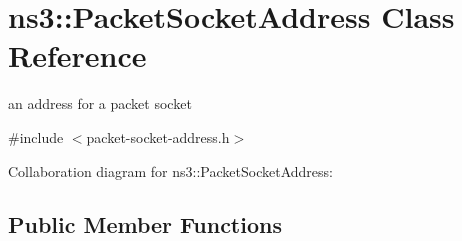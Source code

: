 \hypertarget{classns3_1_1PacketSocketAddress}{}\section{ns3\+:\+:Packet\+Socket\+Address Class Reference}
\label{classns3_1_1PacketSocketAddress}


an address for a packet socket  




{\ttfamily \#include $<$packet-\/socket-\/address.\+h$>$}



Collaboration diagram for ns3\+:\+:Packet\+Socket\+Address\+:
\subsection*{Public Member Functions}
